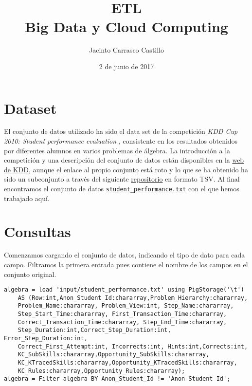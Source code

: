 \documentclass[11pt]{article}
\author{Jacinto Carrasco Castillo}
\date{2 de junio de 2017}
\title{ETL\\\medskip
\large Big Data y Cloud Computing}
\begin{document}
\maketitle
\section{Dataset}
\label{sec:org41b9afe}

El conjunto de datos utilizado ha sido el data set de la competición
\emph{KDD Cup 2010: Student performance evaluation}
\cite{stamper2010algebra}, consistente en los resultados obtenidos por
diferentes alumnos en varios problemas de álgebra. La introducción a
la competición y una descripción del conjunto de datos están
disponibles en la \href{http://www.kdd.org/kdd-cup/view/kdd-cup-2010-student-performance-evaluation/}{web de KDD}, aunque el enlace al propio conjunto está
roto y lo que se ha obtenido ha sido un subconjunto a través del
siguiente \href{https://github.com/Microsoft/azure-docs/blob/master/articles/machine-learning/machine-learning-use-sample-datasets.md}{repositorio} en formato TSV. Al final encontramos el conjunto
de datos \href{https://azuremlsampleexperiments.blob.core.windows.net/datasets/student\_performance.txt}{\texttt{student\_performance.txt}} con el que hemos trabajado aquí.

\section{Consultas}
\label{sec:orgbfe150c}
Comenzamos cargando el conjunto de datos, indicando el tipo de dato
para cada campo. Filtramos la primera entrada pues contiene el nombre
de los campos en el conjunto original.

\begin{verbatim}
algebra = load 'input/student_performance.txt' using PigStorage('\t') 
	AS (Row:int,Anon_Student_Id:chararray,Problem_Hierarchy:chararray,
	Problem_Name:chararray, Problem_View:int, Step_Name:chararray, 
	Step_Start_Time:chararray, First_Transaction_Time:chararray, 
	Correct_Transaction_Time:chararray, Step_End_Time:chararray,
	Step_Duration:int,Correct_Step_Duration:int, Error_Step_Duration:int,
	Correct_First_Attempt:int, Incorrects:int, Hints:int,Corrects:int,
	KC_SubSkills:chararray,Opportunity_SubSkills:chararray,
	KC_KTracedSkills:chararray,Opportunity_KTracedSkills:chararray,
	KC_Rules:chararray,Opportunity_Rules:chararray);
algebra = Filter algebra BY Anon_Student_Id != 'Anon Student Id';
\end{verbatim}
\end{document}
